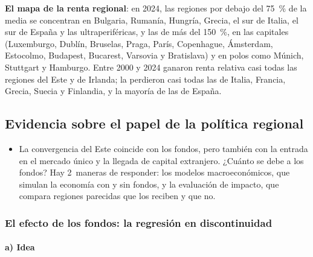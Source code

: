 \documentclass[11pt]{article}
\begin{document}
\begin{anotaciones}
\textbf{El mapa de la renta regional}: en 2024, las regiones por debajo del 75~\% de la media se concentran en Bulgaria, Rumanía, Hungría, Grecia, el sur de Italia, el sur de España y las ultraperiféricas, y las de más del 150~\%, en las capitales (Luxemburgo, Dublín, Bruselas, Praga, París, Copenhague, Ámsterdam, Estocolmo, Budapest, Bucarest, Varsovia y Bratislava) y en polos como Múnich, Stuttgart y Hamburgo. Entre 2000 y 2024 ganaron renta relativa casi todas las regiones del Este y de Irlanda; la perdieron casi todas las de Italia, Francia, Grecia, Suecia y Finlandia, y la mayoría de las de España.
\begin{figuracaja}
\caption{El PIB por habitante de las regiones de la Unión: nivel en 2024 y variación desde 2000 (PPA, UE-27 = 100)}\label{fig:mapa-pib}
\end{figuracaja}
\end{anotaciones}

\subsection{Evidencia sobre el papel de la política regional}\label{sec:papel}

\begin{itemize}
\item La convergencia del Este coincide con los fondos, pero también con la entrada en el mercado único y la llegada de capital extranjero. ¿Cuánto se debe a los fondos? Hay 2~maneras de responder: los modelos macroeconómicos, que simulan la economía con y sin fondos, y la evaluación de impacto, que compara regiones parecidas que los reciben y que no.
\end{itemize}

\subsubsection{El efecto de los fondos: la regresión en discontinuidad}\label{sec:rdd}

\paragraph{a) Idea}
\end{document}
